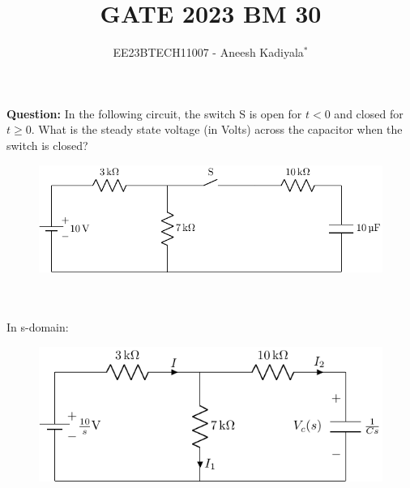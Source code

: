 \documentclass[journal,12pt,twocolumn]{IEEEtran}
\theoremstyle{remark}
\begin{document}

\vspace{3cm}

\title{GATE 2023 BM 30}
\author{EE23BTECH11007 - Aneesh Kadiyala$^{*}$%
}
\maketitle
\newpage
\bigskip

\renewcommand{\thefigure}{\theenumi}
\renewcommand{\thetable}{\theenumi}

\vspace{3cm}
\textbf{Question:} In the following circuit, the switch S is open for $t < 0$ and closed for $t \ge 0$.
What is the steady state voltage (in Volts) across the capacitor when the switch is closed?
\begin{figure}[h!]
    \centering
    \includegraphics[width = \columnwidth]{figs/c_fig1.pdf}
\end{figure}
\\
\solution
\\
In s-domain:
\begin{figure}[h!]
    \centering
    \includegraphics[width=\columnwidth]{figs/c_fig2.pdf}
\end{figure}
\end{document}
